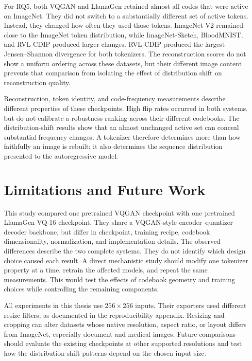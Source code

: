For RQ5, both VQGAN and LlamaGen retained
almost all codes that were active on ImageNet. They did not switch to a
substantially different set of active tokens. Instead, they changed how often
they used those tokens. ImageNet-V2 remained close to the ImageNet token
distribution, while ImageNet-Sketch, BloodMNIST, and RVL-CDIP produced larger
changes. RVL-CDIP produced the largest
Jensen--Shannon divergence for both tokenizers. The reconstruction scores do
not show a uniform ordering across these datasets, but their different image
content prevents that comparison from isolating the effect of distribution
shift on reconstruction quality.

Reconstruction, token identity, and code-frequency measurements describe
different properties of these checkpoints. High flip rates occurred in both
systems, but do not calibrate a robustness ranking across their different
codebooks. The distribution-shift results show that
an almost unchanged active set can conceal substantial frequency changes. A
tokenizer therefore determines more than how faithfully an image is rebuilt;
it also determines the sequence distribution presented to the autoregressive
model.

\section{Limitations and Future Work}
\label{sec:limitations_future_work}

This study compared one pretrained VQGAN checkpoint with one pretrained
LlamaGen VQ-16 checkpoint. They share a VQGAN-style encoder--quantizer--decoder
backbone, but differ in checkpoint, training recipe, codebook dimensionality,
normalization, and implementation details. The observed differences describe
the two complete systems. They do not identify which
design choice caused each result. A direct mechanistic study should modify one
tokenizer property at a time, retrain the affected models, and repeat the same
measurements. This would test the effects of codebook geometry and training
choices while controlling the remaining components.

All experiments in this thesis use $256\times256$ inputs. Their exporters used
different resize filters, as documented in the reproducibility appendix.
Resizing and cropping
can alter datasets whose native resolution, aspect ratio, or layout differs
from ImageNet, especially document and medical images. Future comparisons
should evaluate the existing checkpoints at other supported resolutions and
test how the distribution-shift patterns depend on the chosen input size.

